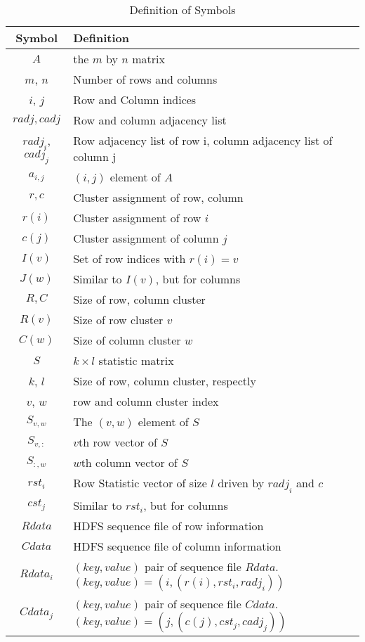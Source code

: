 \documentclass[10pt]{article}
\begin{document}
		\begin{table}
			
			\begin{tabular}{c p{15cm}}
				Symbol & Definition \\ \hline
				$A$ & the $m$ by $n$ matrix \\ 
				$m$, $n$ &  Number of rows and columns \\ 
				$i$, $j$ & Row and Column indices \\
				$radj, cadj$ & Row and column adjacency list \\
				$radj_i$, $cadj_j$ & Row adjacency list of row i, column adjacency list of column j \\
				$a_{i,j}$ & $(i,j)$ element of $A$ \\ \hline
				$r, c$ & Cluster assignment of row, column \\
				$r(i)$ & Cluster assignment of row $i$ \\
				$c(j)$ & Cluster assignment of column $j$ \\
				$I(v)$ & Set of row indices with $r(i)=v$ \\
				$J(w)$ & Similar to $I(v)$, but for columns \\
				$R, C$ & Size of row, column cluster \\
				$R(v)$ & Size of row cluster $v$ \\
				$C(w)$ & Size of column cluster $w$ \\ \hline			
				$S$ & $k \times l$ statistic matrix \\
				$k$, $l$ & Size of row, column cluster, respectly \\
				$v$, $w$ & row and column cluster index \\
				$S_{v,w}$ & The $(v,w)$ element of $S$\\
				$S_{v,:}$ & $v$th row vector of $S$\\
				$S_{:,w}$ & $w$th column vector of $S$\\
				$rst_i$ & Row Statistic vector of size $l$ driven by $radj_i$ and $c$ \\
				$cst_j$ & Similar to $rst_i$, but for columns \\ \hline
				$Rdata$ & HDFS sequence file of row information\\
				$Cdata$ & HDFS sequence file of column information\\
				$Rdata_i$ & $(key,value)$ pair of sequence file $Rdata$. $(key,value)=(i,(r(i),rst_i,radj_i))$\\
				$Cdata_j$ & $(key,value)$ pair of sequence file $Cdata$. $(key,value)=(j,(c(j),cst_j,cadj_j))$\\ \hline
			\end{tabular}
			\caption{Definition of Symbols}
		\end{table}
		
\end{document}
